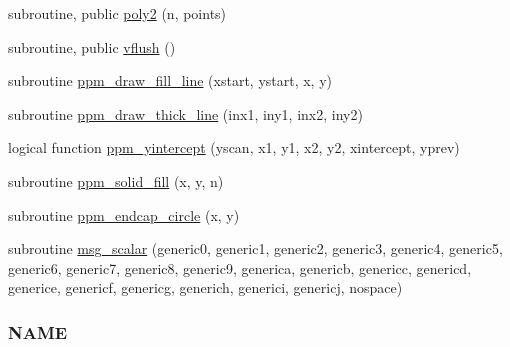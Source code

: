 \begin{DoxyCompactItemize}
\item 
subroutine, public \mbox{\hyperlink{namespacem__pixel_a996117d631dce0e92056a0c486be5109}{poly2}} (n, points)
\item 
subroutine, public \mbox{\hyperlink{namespacem__pixel_ae74cf11194379dbf13069a61b06589a2}{vflush}} ()
\item 
subroutine \mbox{\hyperlink{namespacem__pixel_a6f75bc951acd07267e0841ca5985d8b7}{ppm\+\_\+draw\+\_\+fill\+\_\+line}} (xstart, ystart, x, y)
\item 
subroutine \mbox{\hyperlink{namespacem__pixel_a1629b7134d0ea4b0f301ca23df764b8e}{ppm\+\_\+draw\+\_\+thick\+\_\+line}} (inx1, iny1, inx2, iny2)
\item 
logical function \mbox{\hyperlink{namespacem__pixel_a4924b3a5033acb74a4f4df60a4ba21eb}{ppm\+\_\+yintercept}} (yscan, x1, y1, x2, y2, xintercept, yprev)
\item 
subroutine \mbox{\hyperlink{namespacem__pixel_aedaf33a27e9899da22c2497aff2af903}{ppm\+\_\+solid\+\_\+fill}} (x, y, n)
\item 
subroutine \mbox{\hyperlink{namespacem__pixel_aede24c612504a3e416840e6242c2d8fb}{ppm\+\_\+endcap\+\_\+circle}} (x, y)
\item 
subroutine \mbox{\hyperlink{namespacem__pixel_af907f9c8cb0421cf9c5e6356e355382e}{msg\+\_\+scalar}} (generic0, generic1, generic2, generic3, generic4, generic5, generic6, generic7, generic8, generic9, generica, genericb, genericc, genericd, generice, genericf, genericg, generich, generici, genericj, nospace)
\begin{DoxyCompactList}\small\item\em \subsubsection*{N\+A\+ME}


\end{DoxyCompactList}
\end{DoxyCompactItemize}
